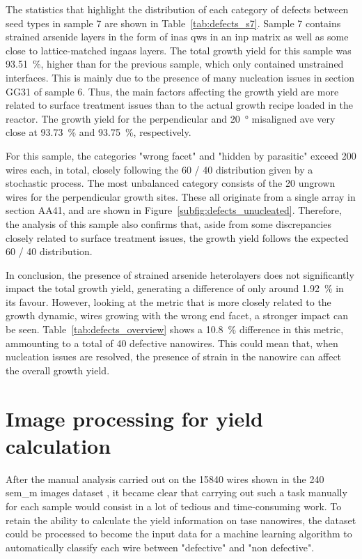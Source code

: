 The statistics that highlight the distribution of each category of defects between seed types in sample 7 are shown in Table~\ref{tab:defects_s7}. Sample 7 contains strained arsenide layers in the form of \acs{inas} \acl{qw}s in an \acs{inp} matrix as well as some close to lattice-matched \acs{ingaas} layers. The total growth yield for this sample was \qty{93.51}{\%}, higher than for the previous sample, which only contained unstrained interfaces. This is mainly due to the presence of many nucleation issues in section GG31 of sample 6. Thus, the main factors affecting the growth yield are more related to surface treatment issues than to the actual growth recipe loaded in the reactor. The growth yield for the perpendicular and \qty{20}{\degree} misaligned ave very close at \qty{93.73}{\%} and \qty{93.75}{\%}, respectively.

For this sample, the categories "wrong facet" and "hidden by parasitic" exceed 200 wires each, in total, closely following the \num{60} / \num{40} distribution given by a stochastic process. The most unbalanced category consists of the \num{20} ungrown wires for the perpendicular growth sites. These all originate from a single array in section AA41, and are shown in Figure~\ref{subfig:defects_unucleated}. Therefore, the analysis of this sample also confirms that, aside from some discrepancies closely related to surface treatment issues, the growth yield follows the expected \num{60} / \num{40} distribution. 

In conclusion, the presence of strained arsenide heterolayers does not significantly impact the total growth yield, generating a difference of only around \qty{1.92}{\percent} in its favour. However, looking at the metric that is more closely related to the growth dynamic, wires growing with the wrong end facet, a stronger impact can be seen. Table~\ref{tab:defects_overview} shows a \qty{10.8}{\percent} difference in this metric, ammounting to a total of \num{40} defective nanowires. This could mean that, when nucleation issues are resolved, the presence of strain in the nanowire can affect the overall growth yield.

\section{Image processing for yield calculation}

After the manual analysis carried out on the \num{15840} wires shown in the \num{240} \acs{sem_m} images dataset \cite{dataset}, it became clear that carrying out such a task manually for each sample would consist in a lot of tedious and time-consuming work. To retain the ability to calculate the yield information on \acs{tase} nanowires, the dataset could be processed to become the input data for a machine learning algorithm to automatically classify each wire between "defective" and "non defective". 

